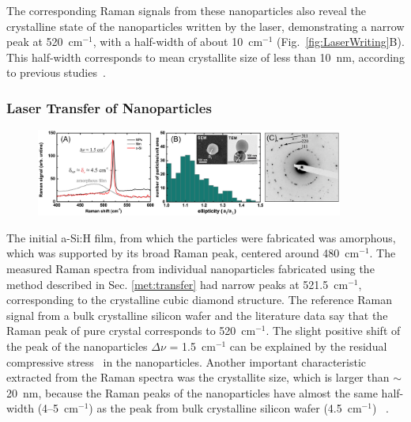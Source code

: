             The corresponding Raman signals from these nanoparticles also reveal the crystalline state of the nanoparticles written
            by the laser, demonstrating a narrow peak at 520~cm$^{-1}$, with a half-width of about 10~cm$^{-1}$ (Fig.~\ref{fig:LaserWriting}B).
            This half-width corresponds to mean crystallite size of less than 10~nm, according to previous studies~\cite{campbell1986effects}.

        \subsubsection{Laser Transfer of Nanoparticles}
            \begin{figure}[!ht]
                    \begin{center}
                        \includegraphics[width=0.9\textwidth]{figs/results/fab/Crystallinity.eps}
                    \end{center}
                    \caption{}
                    \label{fig:Crystallinity}
            \end{figure}

                The initial a-Si:H film, from which the particles were fabricated was amorphous, which was supported by its broad Raman
            peak, centered around 480~cm$^{-1}$. The measured Raman spectra from individual nanoparticles fabricated using the method
            described in Sec. \ref{met:transfer} had narrow peaks at 521.5~cm$^{-1}$, corresponding to the crystalline cubic diamond structure.
            The reference Raman signal from a bulk crystalline silicon wafer and the literature data say that the Raman peak of pure crystal
            corresponds to 520~cm$^{-1}$.
            The slight positive shift of the peak of the nanoparticles $\Delta$$\nu$ = 1.5~cm$^{-1}$ can be explained by the
            residual compressive stress~\cite{de1996micro} in the nanoparticles. Another important characteristic extracted from the Raman spectra
            was the crystallite size, which is larger than $\sim$20~nm, because the Raman peaks of the nanoparticles have
            almost the same half-width (4--5~cm$^{-1}$) as the peak from bulk crystalline silicon wafer (4.5~cm$^{-1}$)
            ~\cite{campbell1986effects}.

